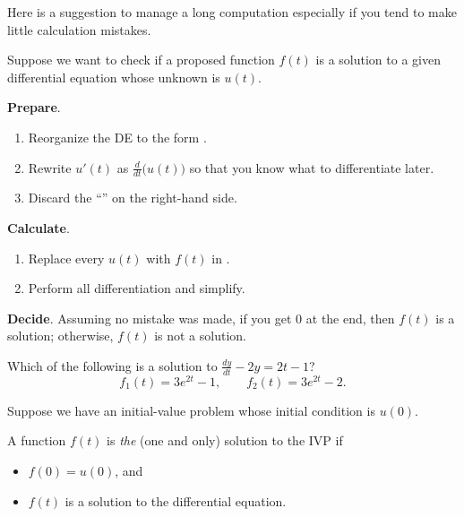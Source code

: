 \documentclass[../main.tex]{subfiles}
\begin{document}
Here is a suggestion to manage a long computation especially if you tend to make little calculation mistakes.
\begin{method} \label{method:verify-de-solution}
  Suppose we want to check if a proposed function \(f(t)\) is a solution to a given differential equation whose unknown is \(u(t)\).

  \textbf{Prepare}.
  \begin{enumerate}[itemsep={0ex}]
    \item Reorganize the DE to the form .
    \item Rewrite \(u'(t)\) as \(\frac{d}{dt} \bigg( u(t) \bigg)\) so that you know what to differentiate later.
    \item Discard the ``'' on the right-hand side. 
  \end{enumerate}

  \textbf{Calculate}.
  \begin{enumerate}[itemsep={0ex}]
    \item Replace every \(u(t)\) with \(f(t)\) in . 
    \item Perform all differentiation and simplify.
  \end{enumerate} 

  \textbf{Decide}. Assuming no mistake was made, if you get \(0\) at the end, then \(f(t)\) is a solution; otherwise, \(f(t)\) is not a solution.
\end{method}

\begin{exercise} \label{ex:de-verify-linear}
  Which of the following is a solution to \(\frac{dy}{dt} - 2y = 2t - 1\)?
  \[
    f_{1}(t) = 3e^{2t} - 1, \qquad f_{2}(t) = 3e^{2t} - 2.
  \]

  \blanks*
\end{exercise}
\clearpage


\begin{definition} \label{def:ivp-solution}
  Suppose we have an initial-value problem whose initial condition is \(u(0)\).  

  A function \(f(t)\) is \emph{the} (one and only) solution to the IVP if 
  \begin{itemize}
    \item \(f(0) = u(0)\), and 
    \item \(f(t)\) is a solution to the differential equation.
  \end{itemize}
\end{definition}
\end{document}
